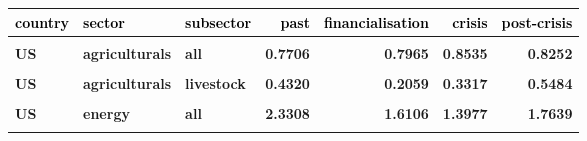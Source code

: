 \documentclass[
  authoryear,
  preprint,
  3p]{elsarticle}
\begin{document}
\begin{longtable}[t]{>{}l>{}l>{}l>{}r>{}r>{}r>{}r}
\toprule
\textcolor{black}{\textbf{country}} & \textcolor{black}{\textbf{sector}} & \textcolor{black}{\textbf{subsector}} & \textcolor{black}{\textbf{past}} & \textcolor{black}{\textbf{financialisation}} & \textcolor{black}{\textbf{crisis}} & \textcolor{black}{\textbf{post-crisis}}\\
\midrule
\textbf{\cellcolor{gray!10}{all}} & \textbf{\cellcolor{gray!10}{all}} & \textbf{\cellcolor{gray!10}{all}} & \textcolor[HTML]{4285f4}{\textbf{\cellcolor{gray!10}{0.8556}}} & \textcolor[HTML]{4285f4}{\textbf{\cellcolor{gray!10}{0.9709}}} & \textcolor[HTML]{4285f4}{\textbf{\cellcolor{gray!10}{1.0352}}} & \textcolor[HTML]{4285f4}{\textbf{\cellcolor{gray!10}{0.9438}}}\\
\textbf{US} & \textbf{agriculturals} & \textbf{all} & \textcolor[HTML]{4285f4}{\textbf{0.7706}} & \textcolor[HTML]{4285f4}{\textbf{0.7965}} & \textcolor[HTML]{4285f4}{\textbf{0.8535}} & \textcolor[HTML]{4285f4}{\textbf{0.8252}}\\
\textbf{\cellcolor{gray!10}{US}} & \textbf{\cellcolor{gray!10}{agriculturals}} & \textbf{\cellcolor{gray!10}{grains}} & \textcolor[HTML]{4285f4}{\textbf{\cellcolor{gray!10}{0.9891}}} & \textcolor[HTML]{4285f4}{\textbf{\cellcolor{gray!10}{1.1982}}} & \textcolor[HTML]{4285f4}{\textbf{\cellcolor{gray!10}{1.1727}}} & \textcolor[HTML]{4285f4}{\textbf{\cellcolor{gray!10}{1.0301}}}\\
\textbf{US} & \textbf{agriculturals} & \textbf{livestock} & \textcolor[HTML]{4285f4}{\textbf{0.4320}} & \textcolor[HTML]{4285f4}{\textbf{0.2059}} & \textcolor[HTML]{4285f4}{\textbf{0.3317}} & \textcolor[HTML]{4285f4}{\textbf{0.5484}}\\
\textbf{\cellcolor{gray!10}{US}} & \textbf{\cellcolor{gray!10}{agriculturals}} & \textbf{\cellcolor{gray!10}{softs}} & \textcolor[HTML]{4285f4}{\textbf{\cellcolor{gray!10}{0.7213}}} & \textcolor[HTML]{4285f4}{\textbf{\cellcolor{gray!10}{0.6900}}} & \textcolor[HTML]{4285f4}{\textbf{\cellcolor{gray!10}{0.7953}}} & \textcolor[HTML]{4285f4}{\textbf{\cellcolor{gray!10}{0.7589}}}\\
\addlinespace
\textbf{US} & \textbf{energy} & \textbf{all} & \textcolor[HTML]{4285f4}{\textbf{2.3308}} & \textcolor[HTML]{4285f4}{\textbf{1.6106}} & \textcolor[HTML]{4285f4}{\textbf{1.3977}} & \textcolor[HTML]{4285f4}{\textbf{1.7639}}\\
\textbf{\cellcolor{gray!10}{US}} & \textbf{\cellcolor{gray!10}{energy}} & \textbf{\cellcolor{gray!10}{gas}} & \textcolor[HTML]{4285f4}{\textbf{\cellcolor{gray!10}{2.6992}}} & \textcolor[HTML]{4285f4}{\textbf{\cellcolor{gray!10}{1.7090}}} & \textcolor[HTML]{4285f4}{\textbf{\cellcolor{gray!10}{1.0044}}} & \textcolor[HTML]{4285f4}{\textbf{\cellcolor{gray!10}{1.2585}}}\\

\end{longtable}
\end{document}
